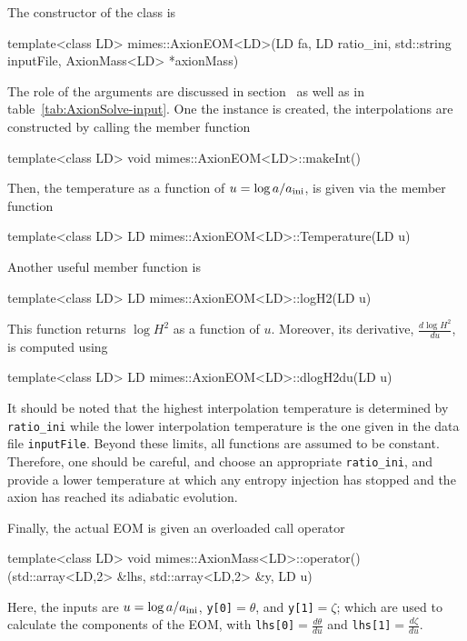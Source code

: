 \documentclass[11pt,a4paper]{article}
\begin{document}
The constructor of the class is
%
\begin{cpp}
	template<class LD>
	mimes::AxionEOM<LD>(LD fa, LD ratio_ini, std::string inputFile, AxionMass<LD> *axionMass)
\end{cpp}
%
The role of the arguments are discussed in section~ as well as in table~\ref{tab:AxionSolve-input}. One the instance is created, the interpolations are constructed by calling the member function
%
\begin{cpp}
	template<class LD> void mimes::AxionEOM<LD>::makeInt()
\end{cpp}
%
Then, the temperature as a function of $u=\log a/a_{\rm ini}{}$, is given via the member function 
%
\begin{cpp}
	template<class LD> LD mimes::AxionEOM<LD>::Temperature(LD u)
\end{cpp}
%
Another useful member function is  
%
\begin{cpp}
	template<class LD> LD mimes::AxionEOM<LD>::logH2(LD u)
\end{cpp}
%
This function returns $\log H^2$  as a function of $u$. Moreover, its derivative, $\frac{d \log H^2}{du}$, is computed using 
%
\begin{cpp}
	template<class LD> LD mimes::AxionEOM<LD>::dlogH2du(LD u)
\end{cpp}
%
It should be noted that the highest interpolation temperature is determined by {\tt ratio\_ini} while the lower interpolation temperature is the one given in the data file {\tt inputFile}. Beyond these limits, all functions are assumed to be constant. Therefore, one should be careful, and choose an appropriate {\tt ratio\_ini}, and provide a lower temperature at which any entropy injection has stopped and the axion has reached its adiabatic evolution.


Finally, the actual EOM is given an overloaded call operator
%
\begin{cpp}
	template<class LD> 
	void mimes::AxionMass<LD>::operator()(std::array<LD,2> &lhs, std::array<LD,2> &y, LD u)
\end{cpp}
%
Here, the inputs are $u=\log a/a_{\rm ini}{}$, {\tt y[0]}$=\theta$, and {\tt y[1]}$=\zeta$; which are used to calculate the components of the EOM, with {\tt lhs[0]}$=\frac{d \theta}{d u}$ and {\tt lhs[1]}$=\frac{d \zeta}{d u}$.
\end{document}
